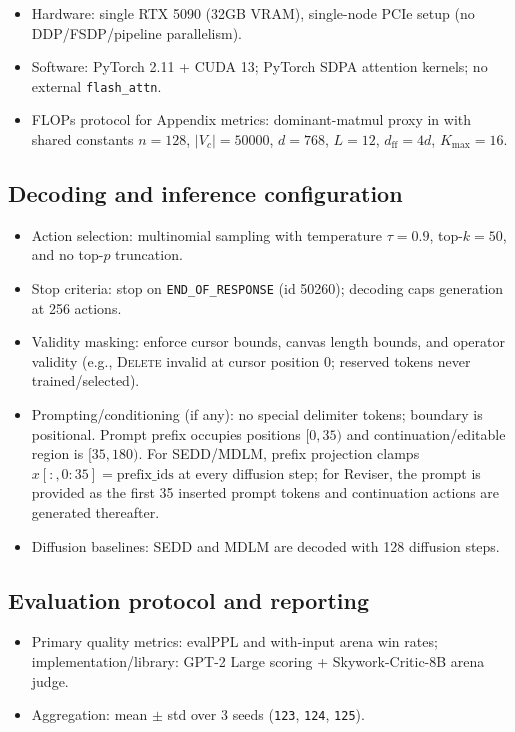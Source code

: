 \documentclass[11pt]{article}
\begin{document}
\begin{itemize}[leftmargin=*,itemsep=0.2em]
\item Hardware: single RTX 5090 (32GB VRAM), single-node PCIe setup (no DDP/FSDP/pipeline parallelism).
\item Software: PyTorch 2.11 + CUDA 13; PyTorch SDPA attention kernels; no external \texttt{flash\_attn}.
\item FLOPs protocol for Appendix metrics: dominant-matmul proxy in  with shared constants $n=128$, $|V_c|=50000$, $d=768$, $L=12$, $d_{\text{ff}}=4d$, $K_{\max}=16$.
\end{itemize}

\subsection{Decoding and inference configuration}
\label{sec:repro_decoding}

\begin{itemize}[leftmargin=*,itemsep=0.2em]
\item Action selection: multinomial sampling with temperature $\tau=0.9$, top-$k=50$, and no top-$p$ truncation.
\item Stop criteria: stop on \texttt{END\_OF\_RESPONSE} (id 50260); decoding caps generation at 256 actions.
\item Validity masking: enforce cursor bounds, canvas length bounds, and operator validity (e.g., \textsc{Delete} invalid at cursor position 0; reserved tokens never trained/selected).
\item Prompting/conditioning (if any): no special delimiter tokens; boundary is positional. Prompt prefix occupies positions $[0,35)$ and continuation/editable region is $[35,180)$. For SEDD/MDLM, prefix projection clamps $x[:,0:35]=\text{prefix\_ids}$ at every diffusion step; for Reviser, the prompt is provided as the first 35 inserted prompt tokens and continuation actions are generated thereafter.
\item Diffusion baselines: SEDD and MDLM are decoded with 128 diffusion steps.
\end{itemize}

\subsection{Evaluation protocol and reporting}
\label{sec:repro_eval}

\begin{itemize}[leftmargin=*,itemsep=0.2em]
\item Primary quality metrics: evalPPL and with-input arena win rates; implementation/library: GPT-2 Large scoring + Skywork-Critic-8B arena judge.
\item Aggregation: mean $\pm$ std over 3 seeds (\texttt{123}, \texttt{124}, \texttt{125}).
\end{itemize}
\end{document}
